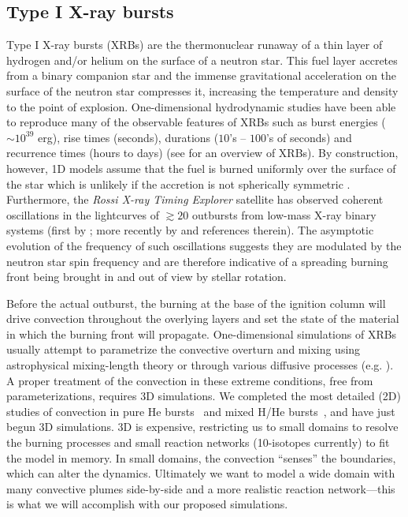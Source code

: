 \documentclass[11pt,letterpaper,english]{article}
\begin{document}
\subsection{Type I X-ray bursts}

Type I X-ray bursts (XRBs) are the thermonuclear runaway of a thin
layer of hydrogen and/or helium on the surface of a neutron star. 
This fuel layer accretes from a binary companion star and the immense
gravitational acceleration on the surface of the neutron star
compresses it, increasing the temperature and density to the point of
explosion.  One-dimensional hydrodynamic studies have been able to
reproduce many of the observable features of XRBs such as burst
energies ($\sim 10^{39}$ erg), rise times (seconds), durations ($10$'s
-- $100$'s of seconds) and recurrence times (hours to days) (see
\cite{STRO_BILD06} for an overview of XRBs).  By construction,
however, 1D models assume that the fuel is burned
uniformly over the surface of the star which is unlikely if the
accretion is not spherically symmetric \cite{SHARA82}.  Furthermore,
the {\em Rossi X-ray Timing Explorer} satellite has observed coherent
oscillations in the lightcurves of $\gtrsim 20$ outbursts from low-mass
X-ray binary
systems (first by \cite{STRO_ETAL96}; more recently by
\cite{ALTAMIRANO_ETAL10} and references therein).  The asymptotic
evolution of the frequency of such oscillations suggests they are
modulated by the neutron star spin frequency \cite{MUNO_ETAL02} and
are therefore indicative of a spreading burning front being brought in
and out of view by stellar rotation.

Before the actual outburst, the burning at the base of the ignition
column will drive convection throughout the overlying layers and set
the state of the material in which the burning front will propagate.
One-dimensional simulations of XRBs usually attempt to parametrize the
convective overturn and mixing using astrophysical mixing-length
theory or through various diffusive processes
(e.g. \cite{HEGER_ETAL00}).  A proper treatment of the convection in
these extreme conditions, free from parameterizations, requires 3D
simulations.  We completed the most detailed (2D) studies of
convection in pure He bursts~\cite{XRB-paper} and mixed H/He
bursts~\cite{XRB2}, and have just begun 3D simulations.  3D is
expensive, restricting us to small domains to resolve the burning
processes and small reaction networks (10-isotopes currently) to fit
the model in memory.  In small domains, the convection ``senses'' 
the boundaries, which can alter the dynamics.  Ultimately we want
to model a wide domain with many convective plumes side-by-side
and a more realistic reaction network---this is what we will
accomplish with our proposed simulations.
\end{document}
